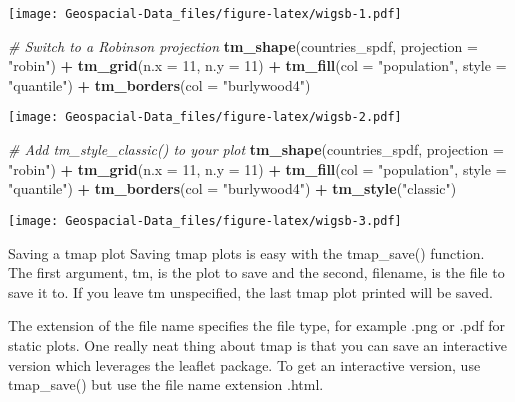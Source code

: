 \documentclass[]{article}
\newenvironment{Shaded}{\begin{snugshade}}{\end{snugshade}}
\newcommand{\CommentTok}[1]{\textcolor[rgb]{0.56,0.35,0.01}{\textit{#1}}}
\newcommand{\DataTypeTok}[1]{\textcolor[rgb]{0.13,0.29,0.53}{#1}}
\newcommand{\DecValTok}[1]{\textcolor[rgb]{0.00,0.00,0.81}{#1}}
\newcommand{\KeywordTok}[1]{\textcolor[rgb]{0.13,0.29,0.53}{\textbf{#1}}}
\newcommand{\NormalTok}[1]{#1}
\newcommand{\OperatorTok}[1]{\textcolor[rgb]{0.81,0.36,0.00}{\textbf{#1}}}
\newcommand{\StringTok}[1]{\textcolor[rgb]{0.31,0.60,0.02}{#1}}
\begin{document}
\texttt{[image: Geospacial-Data\_files/figure-latex/wigsb-1.pdf]}

\begin{Shaded}
\begin{Highlighting}[]
\CommentTok{# Switch to a Robinson projection}
\KeywordTok{tm_shape}\NormalTok{(countries_spdf, }\DataTypeTok{projection =} \StringTok{"robin"}\NormalTok{) }\OperatorTok{+}
\StringTok{  }\KeywordTok{tm_grid}\NormalTok{(}\DataTypeTok{n.x =} \DecValTok{11}\NormalTok{, }\DataTypeTok{n.y =} \DecValTok{11}\NormalTok{) }\OperatorTok{+}
\StringTok{  }\KeywordTok{tm_fill}\NormalTok{(}\DataTypeTok{col =} \StringTok{"population"}\NormalTok{, }\DataTypeTok{style =} \StringTok{"quantile"}\NormalTok{)  }\OperatorTok{+}
\StringTok{  }\KeywordTok{tm_borders}\NormalTok{(}\DataTypeTok{col =} \StringTok{"burlywood4"}\NormalTok{) }
\end{Highlighting}
\end{Shaded}

\texttt{[image: Geospacial-Data\_files/figure-latex/wigsb-2.pdf]}

\begin{Shaded}
\begin{Highlighting}[]
\CommentTok{# Add tm_style_classic() to your plot}
\KeywordTok{tm_shape}\NormalTok{(countries_spdf, }\DataTypeTok{projection =} \StringTok{"robin"}\NormalTok{) }\OperatorTok{+}
\StringTok{  }\KeywordTok{tm_grid}\NormalTok{(}\DataTypeTok{n.x =} \DecValTok{11}\NormalTok{, }\DataTypeTok{n.y =} \DecValTok{11}\NormalTok{) }\OperatorTok{+}
\StringTok{  }\KeywordTok{tm_fill}\NormalTok{(}\DataTypeTok{col =} \StringTok{"population"}\NormalTok{, }\DataTypeTok{style =} \StringTok{"quantile"}\NormalTok{)  }\OperatorTok{+}
\StringTok{  }\KeywordTok{tm_borders}\NormalTok{(}\DataTypeTok{col =} \StringTok{"burlywood4"}\NormalTok{) }\OperatorTok{+}
\StringTok{  }\KeywordTok{tm_style}\NormalTok{(}\StringTok{"classic"}\NormalTok{)}
\end{Highlighting}
\end{Shaded}

\texttt{[image: Geospacial-Data\_files/figure-latex/wigsb-3.pdf]}

Saving a tmap plot Saving tmap plots is easy with the tmap\_save()
function. The first argument, tm, is the plot to save and the second,
filename, is the file to save it to. If you leave tm unspecified, the
last tmap plot printed will be saved.

The extension of the file name specifies the file type, for example .png
or .pdf for static plots. One really neat thing about tmap is that you
can save an interactive version which leverages the leaflet package. To
get an interactive version, use tmap\_save() but use the file name
extension .html.
\end{document}
